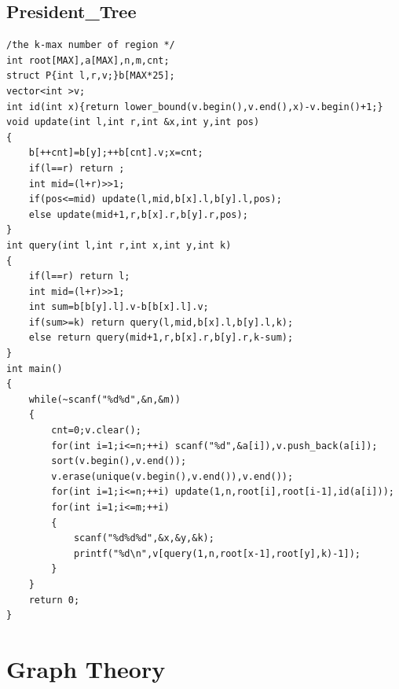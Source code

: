 \documentclass[twoside]{article}
\begin{document}
\subsection{President_Tree}
\begin{lstlisting}
/the k-max number of region */
int root[MAX],a[MAX],n,m,cnt;
struct P{int l,r,v;}b[MAX*25];
vector<int >v;
int id(int x){return lower_bound(v.begin(),v.end(),x)-v.begin()+1;}
void update(int l,int r,int &x,int y,int pos)
{
    b[++cnt]=b[y];++b[cnt].v;x=cnt;
    if(l==r) return ;
    int mid=(l+r)>>1;
    if(pos<=mid) update(l,mid,b[x].l,b[y].l,pos);
    else update(mid+1,r,b[x].r,b[y].r,pos);
}
int query(int l,int r,int x,int y,int k)
{
    if(l==r) return l;
    int mid=(l+r)>>1;
    int sum=b[b[y].l].v-b[b[x].l].v;
    if(sum>=k) return query(l,mid,b[x].l,b[y].l,k);
    else return query(mid+1,r,b[x].r,b[y].r,k-sum);
}
int main()
{
    while(~scanf("%d%d",&n,&m))
    {
        cnt=0;v.clear();
        for(int i=1;i<=n;++i) scanf("%d",&a[i]),v.push_back(a[i]);
        sort(v.begin(),v.end());
        v.erase(unique(v.begin(),v.end()),v.end());
        for(int i=1;i<=n;++i) update(1,n,root[i],root[i-1],id(a[i]));
        for(int i=1;i<=m;++i)
        {
            scanf("%d%d%d",&x,&y,&k);
            printf("%d\n",v[query(1,n,root[x-1],root[y],k)-1]);
        }
    }
    return 0;
}
\end{lstlisting}
\clearpage\section{Graph Theory}
\end{document}
